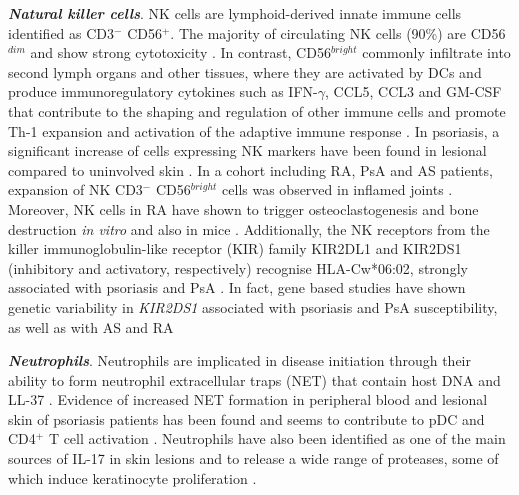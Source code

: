 \textbf{\textit{Natural killer cells}}. NK cells are lymphoid-derived innate immune cells identified as CD3$^-$ CD56$^+$. The majority of circulating NK cells (90\%) are CD56$^{dim}$ and show strong cytotoxicity \parencite{Mandal2015}. In contrast, CD56$^{bright}$  commonly infiltrate into second lymph organs and other tissues, where they are activated by DCs and produce immunoregulatory cytokines such as IFN-$\gamma$, CCL5, CCL3 and GM-CSF that contribute to the shaping and regulation of other immune cells and promote Th-1 expansion and activation of the adaptive immune response \parencite{Martin-Fontecha2004,Ferlazzo2004}. In psoriasis, a significant increase of cells expressing NK markers have been found in lesional compared to uninvolved skin \parencite{Cameron2003,Ottaviani2006}.  %
 In a cohort including RA, PsA and AS patients, expansion of NK CD3$^-$ CD56$^{bright}$ cells was observed in inflamed joints \parencite{Dalbeth2002}. Moreover, NK cells in RA have shown to trigger osteoclastogenesis and bone destruction \textit{in vitro} and also in mice \parencite{Soederstroem2010}. %
Additionally, the NK receptors from the killer immunoglobulin-like receptor (KIR) family KIR2DL1 and KIR2DS1 (inhibitory and activatory, respectively) recognise HLA-Cw*06:02, strongly associated with psoriasis and PsA \parencite{Tobin2011}. In fact, gene based studies have shown genetic variability in \textit{KIR2DS1} associated with psoriasis and PsA susceptibility, as well as with AS and RA \parencite{Luszczek2004, Williams2005,Carter2007,Yen2001}


\textbf{\textit{Neutrophils}}. Neutrophils are implicated in disease initiation through their ability to form neutrophil extracellular traps (NET) that contain host DNA and LL-37 \parencite{Hu2016}. Evidence of increased NET formation in peripheral blood and lesional skin of psoriasis patients has been found and seems to contribute to pDC and CD4$^+$ T cell activation \parencite{Hu2016}. Neutrophils have also been identified as one of the main sources of IL-17  in skin lesions and to release a wide range of proteases, some of which induce keratinocyte proliferation \parencite{Lin2011,Mahil2016}.


